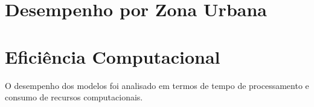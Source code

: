 \documentclass[
    12pt,
    openright,
    oneside,
    a4paper,
    sumario=tradicional,
    english,
    brazil,
    ]{abntex2}
\begin{document}
%

\section{Desempenho por Zona Urbana}

%

\section{Eficiência Computacional}

O desempenho dos modelos foi analisado em termos de tempo de processamento e consumo de recursos computacionais.
\end{document}

